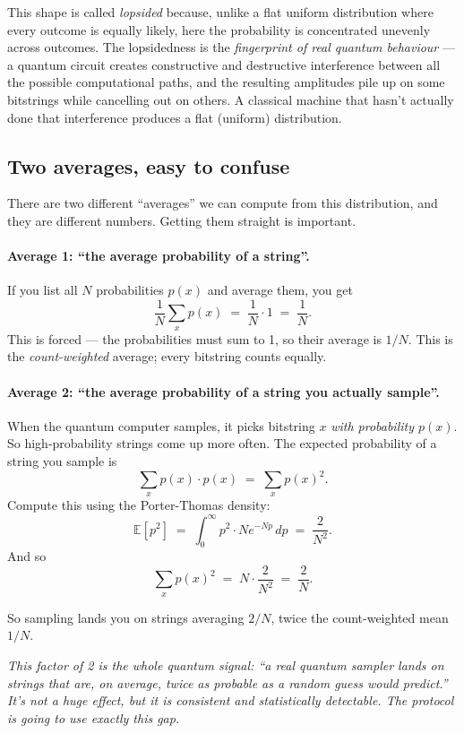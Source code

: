 \documentclass[11pt]{article}
\newenvironment{aside}{\par\medskip\noindent\itshape\small\color{black!70}}{\normalfont\par\medskip}
\newcommand{\formula}[1]{\[\boxed{#1}\]}
\begin{document}
This shape is called \emph{lopsided} because, unlike a flat uniform distribution where every outcome is equally likely, here the probability is concentrated unevenly across outcomes. The lopsidedness is the \emph{fingerprint of real quantum behaviour} --- a quantum circuit creates constructive and destructive interference between all the possible computational paths, and the resulting amplitudes pile up on some bitstrings while cancelling out on others. A classical machine that hasn't actually done that interference produces a flat (uniform) distribution.

\subsection*{Two averages, easy to confuse}

There are two different ``averages'' we can compute from this distribution, and they are different numbers. Getting them straight is important.

\paragraph{Average 1: ``the average probability of a string''.} If you list all $N$ probabilities $p(x)$ and average them, you get
\[
\frac{1}{N}\sum_x p(x) \;=\; \frac{1}{N}\cdot 1 \;=\; \frac{1}{N}.
\]
This is forced --- the probabilities must sum to 1, so their average is $1/N$. This is the \emph{count-weighted} average; every bitstring counts equally.

\paragraph{Average 2: ``the average probability of a string you actually sample''.} When the quantum computer samples, it picks bitstring $x$ \emph{with probability $p(x)$}. So high-probability strings come up more often. The expected probability of a string you sample is
\[
\sum_x p(x) \cdot p(x) \;=\; \sum_x p(x)^2.
\]
Compute this using the Porter-Thomas density:
\[
\mathbb{E}[p^2] \;=\; \int_0^{\infty} p^2 \cdot N e^{-Np}\, dp \;=\; \frac{2}{N^2}.
\]
And so
\formula{\sum_x p(x)^2 \;=\; N \cdot \frac{2}{N^2} \;=\; \frac{2}{N}.}

\noindent So sampling lands you on strings averaging $2/N$, twice the count-weighted mean $1/N$.

\begin{aside}
This factor of 2 is the whole quantum signal: ``a real quantum sampler lands on strings that are, on average, twice as probable as a random guess would predict.'' It's not a huge effect, but it is consistent and statistically detectable. The protocol is going to use exactly this gap.
\end{aside}
\end{document}
